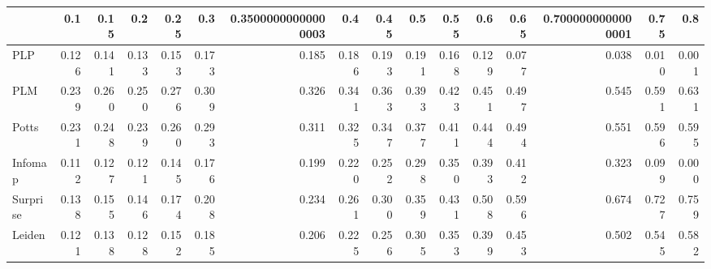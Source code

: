 \begin{tabular}{lrrrrrrrrrrrrrrr}
\toprule
{} &   0.1 &  0.15 &   0.2 &  0.25 &   0.3 & 0.35000000000000003 &   0.4 &  0.45 &   0.5 &  0.55 &   0.6 &  0.65 & 0.7000000000000001 &  0.75 &   0.8 \\
\midrule
PLP      & 0.126 & 0.141 & 0.133 & 0.153 & 0.173 &               0.185 & 0.186 & 0.193 & 0.191 & 0.168 & 0.129 & 0.077 &              0.038 & 0.010 & 0.001 \\
PLM      & 0.239 & 0.260 & 0.250 & 0.276 & 0.309 &               0.326 & 0.341 & 0.363 & 0.393 & 0.423 & 0.451 & 0.497 &              0.545 & 0.591 & 0.631 \\
Potts    & 0.231 & 0.248 & 0.239 & 0.260 & 0.293 &               0.311 & 0.325 & 0.347 & 0.377 & 0.411 & 0.444 & 0.494 &              0.551 & 0.596 & 0.595 \\
Infomap  & 0.112 & 0.127 & 0.121 & 0.145 & 0.176 &               0.199 & 0.220 & 0.252 & 0.298 & 0.350 & 0.393 & 0.412 &              0.323 & 0.099 & 0.000 \\
Surprise & 0.138 & 0.155 & 0.146 & 0.174 & 0.208 &               0.234 & 0.261 & 0.300 & 0.359 & 0.431 & 0.508 & 0.596 &              0.674 & 0.727 & 0.759 \\
Leiden   & 0.121 & 0.138 & 0.128 & 0.152 & 0.185 &               0.206 & 0.225 & 0.256 & 0.305 & 0.353 & 0.399 & 0.453 &              0.502 & 0.545 & 0.582 \\
\bottomrule
\end{tabular}
